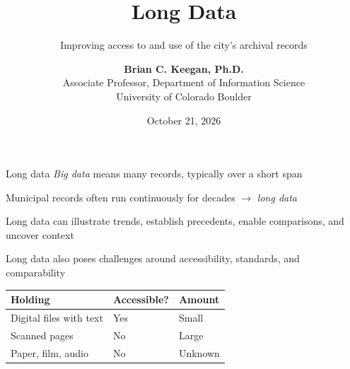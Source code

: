 \documentclass[9pt,aspectratio=169,onlytextwidth]{beamer}
\title[Long Data]{{\Huge Long Data}}
\subtitle{Improving access to and use of the city's archival records}
\author[Keegan]{\textbf{Brian C. Keegan, Ph.D.} \\ Associate Professor, Department of Information Science \\ University of Colorado Boulder}
\date{October 21, 2026}
\begin{document}
\maketitle

\begin{frame}{Long data}
    \textit{Big data} means many records, typically over a short span

    \medskip

    Municipal records often run continuously for decades $\rightarrow$ \textit{long data}

    \medskip

    Long data can illustrate trends, establish precedents, enable comparisons, and uncover context

    \medskip

    Long data also poses challenges around accessibility, standards, and comparability
            
    \begin{center}
        \begin{tabular}{lll}
            \toprule
            \textbf{Holding} & \textbf{Accessible?} & \textbf{Amount} \\
            \midrule
            Digital files with text & Yes & Small \\
            Scanned pages           & No  & Large \\
            Paper, film, audio      & No  & Unknown \\
            \bottomrule
        \end{tabular}
    \end{center}

\end{frame}

\end{document}
